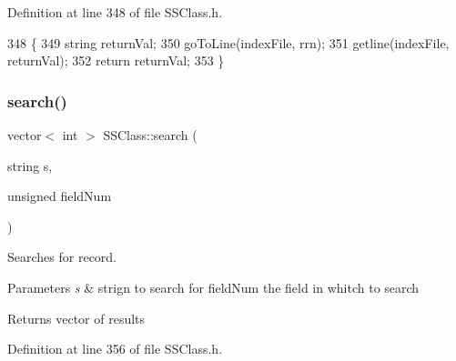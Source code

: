 Definition at line 348 of file S\+S\+Class.\+h.


\begin{DoxyCode}
348                                   \{
349     \textcolor{keywordtype}{string} returnVal;
350     goToLine(indexFile, rrn);
351     getline(indexFile, returnVal);
352     \textcolor{keywordflow}{return} returnVal;
353 \}
\end{DoxyCode}
\mbox{\label{classSSClass_a9df3598c000a6a5e9ef994d19196e69f}} 
\subsubsection{\texorpdfstring{search()}{search()}}
{\footnotesize\ttfamily vector$<$ int $>$ S\+S\+Class\+::search (\begin{DoxyParamCaption}\item[{string}]{s,  }\item[{unsigned}]{field\+Num }\end{DoxyParamCaption})}



Searches for record. 


\begin{DoxyParams}{Parameters}
{\em s} & strign to search for  field\+Num the field in whitch to search \\
\hline
\end{DoxyParams}
\begin{DoxyReturn}{Returns}
vector of results 
\end{DoxyReturn}


Definition at line 356 of file S\+S\+Class.\+h.


